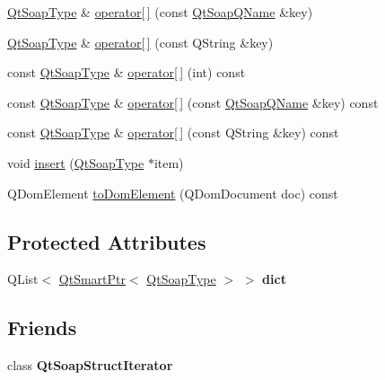 \begin{DoxyCompactItemize}
\item 
\mbox{\hyperlink{class_qt_soap_type}{Qt\+Soap\+Type}} \& \mbox{\hyperlink{class_qt_soap_struct_a97effee02f1a2d4b3d27d9f53af7f82c}{operator\mbox{[}$\,$\mbox{]}}} (const \mbox{\hyperlink{class_qt_soap_q_name}{Qt\+Soap\+Q\+Name}} \&key)
\item 
\mbox{\hyperlink{class_qt_soap_type}{Qt\+Soap\+Type}} \& \mbox{\hyperlink{class_qt_soap_struct_a53d62e284629dee8e40a7252af09dd24}{operator\mbox{[}$\,$\mbox{]}}} (const Q\+String \&key)
\item 
const \mbox{\hyperlink{class_qt_soap_type}{Qt\+Soap\+Type}} \& \mbox{\hyperlink{class_qt_soap_struct_a07bf701388dfc9ee083e6549566543b4}{operator\mbox{[}$\,$\mbox{]}}} (int) const
\item 
const \mbox{\hyperlink{class_qt_soap_type}{Qt\+Soap\+Type}} \& \mbox{\hyperlink{class_qt_soap_struct_a147c5243765bd31a1b50fcbfa9c68b00}{operator\mbox{[}$\,$\mbox{]}}} (const \mbox{\hyperlink{class_qt_soap_q_name}{Qt\+Soap\+Q\+Name}} \&key) const
\item 
const \mbox{\hyperlink{class_qt_soap_type}{Qt\+Soap\+Type}} \& \mbox{\hyperlink{class_qt_soap_struct_a914d2ec01b832aa133a4bb159913b072}{operator\mbox{[}$\,$\mbox{]}}} (const Q\+String \&key) const
\item 
void \mbox{\hyperlink{class_qt_soap_struct_aff72b9260ac8a59e856d1faf58b56f21}{insert}} (\mbox{\hyperlink{class_qt_soap_type}{Qt\+Soap\+Type}} $\ast$item)
\item 
Q\+Dom\+Element \mbox{\hyperlink{class_qt_soap_struct_a3a57e002d42e8d048b0c0bf9678ff2f9}{to\+Dom\+Element}} (Q\+Dom\+Document doc) const
\end{DoxyCompactItemize}
\subsection*{Protected Attributes}
\begin{DoxyCompactItemize}
\item 
\mbox{\label{class_qt_soap_struct_a2e9c6d1df59e6cacda31f8b9f38a9b92}} 
Q\+List$<$ \mbox{\hyperlink{class_qt_smart_ptr}{Qt\+Smart\+Ptr}}$<$ \mbox{\hyperlink{class_qt_soap_type}{Qt\+Soap\+Type}} $>$ $>$ {\bfseries dict}
\end{DoxyCompactItemize}
\subsection*{Friends}
\begin{DoxyCompactItemize}
\item 
\mbox{\label{class_qt_soap_struct_a757c584f41a652f42a97d5b6225241aa}} 
class {\bfseries Qt\+Soap\+Struct\+Iterator}
\end{DoxyCompactItemize}
